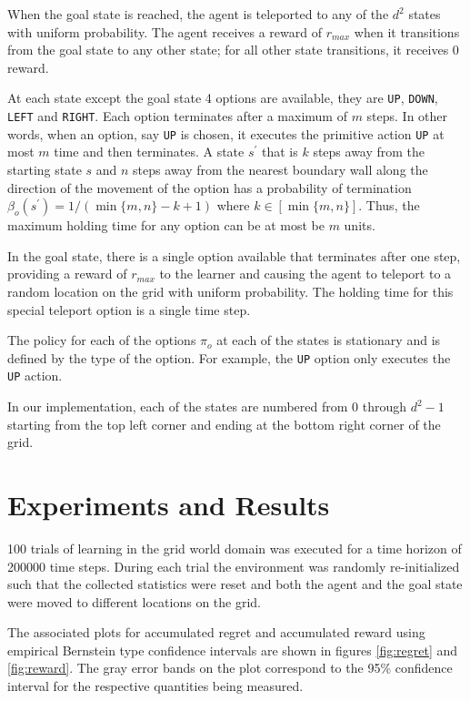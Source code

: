 When the goal state is reached, the agent is teleported to any of the $d^2$ states with uniform probability.
The agent receives a reward of $r_{max}$ when it transitions from the goal state to any other state; for all other state transitions, it receives 0 reward.

At each state except the goal state 4 options are available, they are \texttt{UP}, \texttt{DOWN}, \texttt{LEFT} and \texttt{RIGHT}.
Each option terminates after a maximum of $m$ steps. 
In other words, when an option, say \texttt{UP} is chosen, it executes the primitive action \texttt{UP} at most $m$ time and then terminates.
A state $s^\prime$ that is $k$ steps away from the starting state $s$ and $n$ steps away from the nearest boundary wall along the direction of the movement of the option has a probability of termination $\beta_o(s^\prime) = 1/(\min\{m, n\} - k + 1)$ where $k \in [\min\{m, n\}]$.
Thus, the maximum holding time for any option can be at most be $m$ units.

In the goal state, there is a single option available that terminates after one step, providing a reward of $r_{max}$ to the learner and causing the agent to teleport to a random location on the grid with uniform probability.
The holding time for this special teleport option is a single time step.

The policy for each of the options $\pi_o$ at each of the states is stationary and is defined by the type of the option.
For example, the \texttt{UP} option only executes the \texttt{UP} action.

In our implementation, each of the states are numbered from 0 through $d^2 - 1$ starting from the top left corner and ending at the bottom right corner of the grid.


\section{Experiments and Results}

100 trials of learning in the grid world domain was executed for a time horizon of 200000 time steps.
During each trial the environment was randomly re-initialized such that the collected statistics were reset and both the agent and the goal state were moved to different locations on the grid.

The associated plots for accumulated regret and accumulated reward using empirical Bernstein type confidence intervals are shown in figures \ref{fig:regret} and  \ref{fig:reward}.
The gray error bands on the plot correspond to the 95\% confidence interval for the respective quantities being measured.

